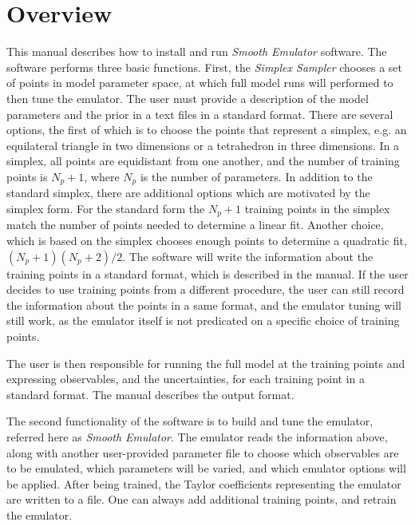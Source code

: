 \documentclass[12pt]{article}
\numberwithin{equation}{section}
\numberwithin{figure}{section}
\begin{document}
\newpage

\thispagestyle{empty}

\tableofcontents

\newpage

\thispagestyle{empty}

\section{Overview}\label{sec:overview}

This manual describes how to install and run {\it Smooth Emulator} software. The software performs three basic functions. First, the {\it {\it Simplex Sampler}} chooses a set of points in model parameter space, at which full model runs will performed to then tune the emulator. The user must provide a description of the model parameters and the prior in a text files in a standard format. There are several options, the first of which is to choose the points that represent a simplex, e.g. an equilateral triangle in two dimensions or a tetrahedron in three dimensions. In a simplex, all points are equidistant from one another, and the number of training points is $N_p+1$, where $N_p$ is the number of parameters. In addition to the standard simplex, there are additional options which are motivated by the simplex form. For the standard form the  $N_p+1$ training points in the simplex match the number of points needed to determine a linear fit. Another choice, which is based on the simplex chooses enough points to determine a quadratic fit, $(N_p+1)(N_p+2)/2$. The software will write the information about the training points in a standard format, which is described in the manual. If the user decides to use training points from a different procedure, the user can still record the information about the points in a same format, and the emulator tuning will still work, as the emulator itself is not predicated on a specific choice of training points.

 The user is then responsible for running the full model at the training points and expressing observables, and the uncertainties, for each training point in a standard format. The manual describes the output format.

 The second functionality of the software is to build and tune the emulator, referred here as {\it {\it Smooth Emulator}}. The emulator reads the information above, along with another user-provided parameter file to choose which observables are to be emulated, which parameters will be varied, and which emulator options will be applied. After being trained, the Taylor coefficients representing the emulator are written to a file. One can always add additional training points, and retrain the emulator. 
\end{document}
